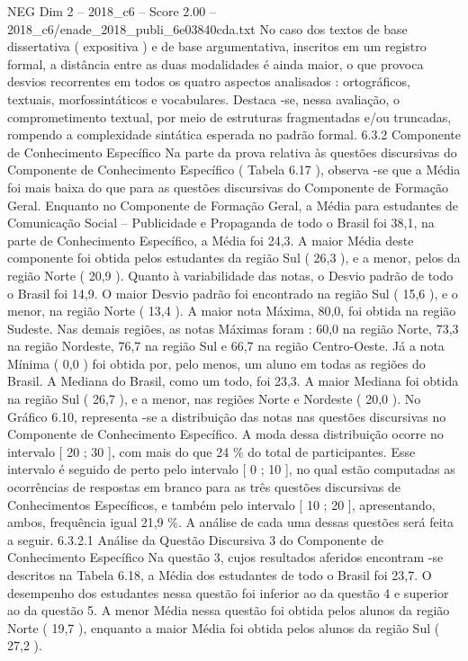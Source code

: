 \begin{textsample}{NEG Dim 2 – 2018\_c6 – Score 2.00 – 2018\_c6/enade\_2018\_publi\_6e03840cda.txt}
No caso dos textos de base dissertativa ( expositiva ) e de base argumentativa, inscritos em um registro formal, a distância entre as duas modalidades é ainda maior, o que provoca desvios recorrentes em todos os quatro aspectos analisados : ortográficos, textuais, morfossintáticos e vocabulares.
Destaca -se, nessa avaliação, o comprometimento textual, por meio de estruturas fragmentadas e/ou truncadas, rompendo a complexidade sintática esperada no padrão formal. 6.3.2 Componente de Conhecimento Específico Na parte da prova relativa às questões discursivas do Componente de Conhecimento Específico ( Tabela 6.17 ), observa -se que a Média foi mais baixa do que para as questões discursivas do Componente de Formação Geral.
Enquanto no Componente de Formação Geral, a Média para estudantes de Comunicação Social – Publicidade e Propaganda de todo o Brasil foi 38,1, na parte de Conhecimento Específico, a Média foi 24,3.
A maior Média deste componente foi obtida pelos estudantes da região Sul ( 26,3 ), e a menor, pelos da região Norte ( 20,9 ).
Quanto à variabilidade das notas, o Desvio padrão de todo o Brasil foi 14,9.
O maior Desvio padrão foi encontrado na região Sul ( 15,6 ), e o menor, na região Norte ( 13,4 ).
A maior nota Máxima, 80,0, foi obtida na região Sudeste.
Nas demais regiões, as notas Máximas foram : 60,0 na região Norte, 73,3 na região Nordeste, 76,7 na região Sul e 66,7 na região Centro-Oeste.
Já a nota Mínima ( 0,0 ) foi obtida por, pelo menos, um aluno em todas as regiões do Brasil.
A Mediana do Brasil, como um todo, foi 23,3.
A maior Mediana foi obtida na região Sul ( 26,7 ), e a menor, nas regiões Norte e Nordeste ( 20,0 ).
No Gráfico 6.10, representa -se a distribuição das notas nas questões discursivas no Componente de Conhecimento Específico.
A moda dessa distribuição ocorre no intervalo [ 20 ; 30 ], com mais do que 24 \% do total de participantes.
Esse intervalo é seguido de perto pelo intervalo [ 0 ; 10 ], no qual estão computadas as ocorrências de respostas em branco para as três questões discursivas de Conhecimentos Específicos, e também pelo intervalo [ 10 ; 20 ], apresentando, ambos, frequência igual 21,9 \%.
A análise de cada uma dessas questões será feita a seguir. 6.3.2.1 Análise da Questão Discursiva 3 do Componente de Conhecimento Específico Na questão 3, cujos resultados aferidos encontram -se descritos na Tabela 6.18, a Média dos estudantes de todo o Brasil foi 23,7.
O desempenho dos estudantes nessa questão foi inferior ao da questão 4 e superior ao da questão 5.
A menor Média nessa questão foi obtida pelos alunos da região Norte ( 19,7 ), enquanto a maior Média foi obtida pelos alunos da região Sul ( 27,2 ).

\end{textsample}
